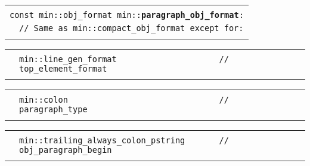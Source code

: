 \documentclass[12pt]{article}
\makeatletter
\newcommand{\TT}[1]{{\tt \bfseries #1}}
\newcommand{\ttindex}[1]{\index{#1@{\tt #1}}}
\newenvironment{indpar}[1][0.3in]%
	{\begin{list}{}%
		     {\setlength{\itemsep}{0in}%
		      \setlength{\topsep}{0in}%
		      \setlength{\parsep}{1ex}%
		      \setlength{\labelwidth}{#1}%
		      \setlength{\leftmargin}{#1}%
		      \addtolength{\leftmargin}{\labelsep}}%
	 \item}%
	{\end{list}}
\newcommand{\LABEL}[1]{\label{#1}}
\newlength{\ARGBREAKLENGTH}
\newcommand{\ARGBREAK}[1][\ARGBREAKLENGTH]{\\&\hspace*{#1}}
\newcommand{\MINKEY}[1]%
	   {\TT{#1}\ttindex{min::#1}\ttindex{#1}}
\makeatother
\begin{document}
\begin{indpar}[1em]

\begin{tabular}{r@{}l}\hspace*{0.1in} \\[-3ex]
\multicolumn{2}{l}{\tt const min::obj\_format
                   min::\MINKEY{paragraph\_obj\_format}:}%
\LABEL{MIN::PARAGRAPH_OBJ_FORMAT}\ARGBREAK
\verb|// Same as min::compact_obj_format except for:|\ARGBREAK
\end{tabular}

\vspace{-4ex}\begin{tabular}{r@{}l}\hspace*{0.1in}\ARGBREAK
\verb|min::line_gen_format                     // top_element_format|\ARGBREAK
\end{tabular}

\vspace{-4ex}\begin{tabular}{r@{}l}\hspace*{0.1in}\ARGBREAK
\verb|min::colon                               // paragraph_type|\ARGBREAK
\end{tabular}

\vspace{-4ex}\begin{tabular}{r@{}l}\hspace*{0.1in}\ARGBREAK
\verb|min::trailing_always_colon_pstring       // obj_paragraph_begin|\ARGBREAK
\end{tabular}

\end{indpar}
\end{document}
